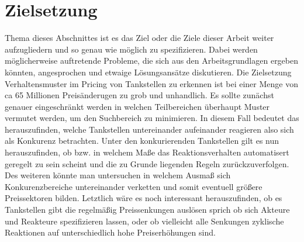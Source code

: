 \documentclass[12pt,a4paper,bibliography=totocnumbered,listof=totocnumbered]{scrartcl}
\begin{document}

\vspace{-1,2em}
\newpage

\section{Zielsetzung}
Thema dieses Abschnittes ist es das Ziel oder die Ziele dieser Arbeit weiter aufzugliedern und so genau wie möglich zu spezifizieren. Dabei werden möglicherweise auftretende Probleme, die sich aus den Arbeitsgrundlagen ergeben könnten, angesprochen und etwaige Lösungsansätze diskutieren. Die Zielsetzung Verhaltensmuster im Pricing von Tankstellen zu erkennen ist bei einer Menge von ca 65 Millionen Preisänderugen zu grob und unhandlich. Es sollte zunächst genauer eingeschränkt werden in welchen Teilbereichen überhaupt Muster vermutet werden, um den Suchbereich zu minimieren. In diesem Fall bedeutet das herauszufinden, welche Tankstellen untereinander aufeinander reagieren also sich als Konkurenz betrachten. Unter den konkurierenden Tankstellen gilt es nun herauszufinden, ob bzw. in welchem Maße das Reaktionsverhalten automatisert geregelt zu sein scheint und die zu Grunde liegenden Regeln zurückzuverfolgen. Des weiteren könnte man untersuchen in welchem Ausmaß sich Konkurenzbereiche  untereinander verketten und somit eventuell größere Preissektoren bilden. Letztlich wäre es noch interessant herauszufinden, ob es Tankstellen gibt die regelmäßig Preissenkungen auslösen sprich ob sich Akteure und Reakteure spezifizieren lassen, oder ob vielleicht alle Senkungen zyklische Reaktionen auf unterschiedlich hohe Preiserhöhungen sind.

\end{document}
